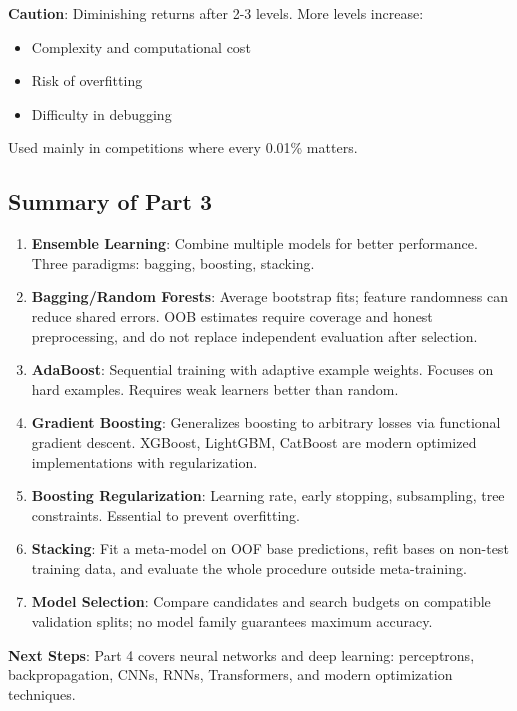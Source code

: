 \documentclass[11pt,twoside]{article}
\numberwithin{equation}{section}
\theoremstyle{plain}
\theoremstyle{definition}
\theoremstyle{remark}
\begin{document}
\textbf{Caution}: Diminishing returns after 2-3 levels. More levels increase:
\begin{itemize}
\item Complexity and computational cost
\item Risk of overfitting
\item Difficulty in debugging
\end{itemize}

Used mainly in competitions where every 0.01\% matters.

\subsection{Summary of Part 3}

\begin{tcolorbox}[colback=yellow!10!white,colframe=orange!75!black,title=Key Takeaways]
\begin{enumerate}
\item \textbf{Ensemble Learning}: Combine multiple models for better performance. Three paradigms: bagging, boosting, stacking.

\item \textbf{Bagging/Random Forests}: Average bootstrap fits; feature randomness can reduce shared errors. OOB estimates require coverage and honest preprocessing, and do not replace independent evaluation after selection.

\item \textbf{AdaBoost}: Sequential training with adaptive example weights. Focuses on hard examples. Requires weak learners better than random.

\item \textbf{Gradient Boosting}: Generalizes boosting to arbitrary losses via functional gradient descent. XGBoost, LightGBM, CatBoost are modern optimized implementations with regularization.

\item \textbf{Boosting Regularization}: Learning rate, early stopping, subsampling, tree constraints. Essential to prevent overfitting.

\item \textbf{Stacking}: Fit a meta-model on OOF base predictions, refit bases on non-test training data, and evaluate the whole procedure outside meta-training.

\item \textbf{Model Selection}: Compare candidates and search budgets on compatible validation splits; no model family guarantees maximum accuracy.
\end{enumerate}

\textbf{Next Steps}: Part 4 covers neural networks and deep learning: perceptrons, backpropagation, CNNs, RNNs, Transformers, and modern optimization techniques.
\end{tcolorbox}
\end{document}

